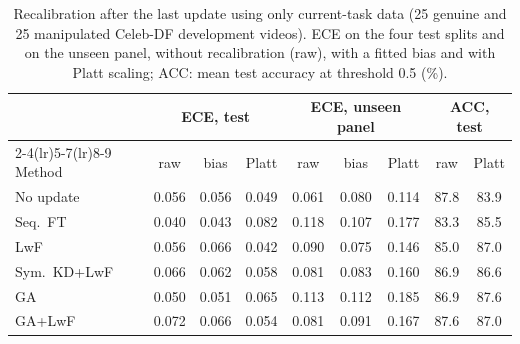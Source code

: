 \documentclass[journal]{IEEEtran}
\begin{document}
\begin{table}[t]
\caption{Recalibration after the last update using only current-task data (25 genuine and 25 manipulated Celeb-DF development videos). ECE on the four test splits and on the unseen panel, without recalibration (raw), with a fitted bias and with Platt scaling; ACC: mean test accuracy at threshold 0.5 (\%).}
\label{tab:recal}
\centering
\footnotesize
\setlength{\tabcolsep}{2.4pt}
\begin{tabular}{@{}lcccccccc@{}}
\toprule
& \multicolumn{3}{c}{ECE, test} & \multicolumn{3}{c}{ECE, unseen panel} & \multicolumn{2}{c}{ACC, test} \\
\cmidrule(lr){2-4}\cmidrule(lr){5-7}\cmidrule(lr){8-9}
Method & raw & bias & Platt & raw & bias & Platt & raw & Platt \\
\midrule
No update & 0.056 & 0.056 & 0.049 & 0.061 & 0.080 & 0.114 & 87.8 & 83.9 \\
Seq.\ FT & 0.040 & 0.043 & 0.082 & 0.118 & 0.107 & 0.177 & 83.3 & 85.5 \\
LwF & 0.056 & 0.066 & 0.042 & 0.090 & 0.075 & 0.146 & 85.0 & 87.0 \\
Sym.\ KD+LwF & 0.066 & 0.062 & 0.058 & 0.081 & 0.083 & 0.160 & 86.9 & 86.6 \\
GA & 0.050 & 0.051 & 0.065 & 0.113 & 0.112 & 0.185 & 86.9 & 87.6 \\
GA+LwF & 0.072 & 0.066 & 0.054 & 0.081 & 0.091 & 0.167 & 87.6 & 87.0 \\
\bottomrule
\end{tabular}
\end{table}



\end{document}
